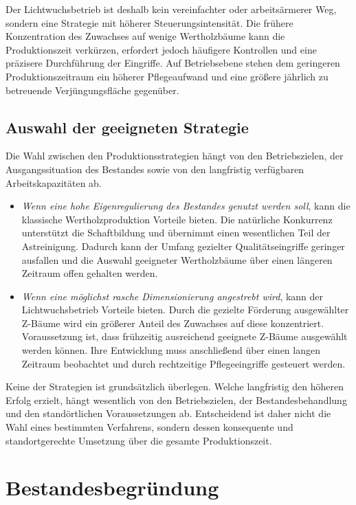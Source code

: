 \documentclass[twocolumn, bibliography=totoc, abstract=true]{scrartcl}
\begin{document}
Der Lichtwuchsbetrieb ist deshalb kein vereinfachter oder arbeitsärmerer Weg, sondern eine Strategie mit höherer Steuerungsintensität. Die frühere Konzentration des Zuwachses auf wenige Wertholzbäume kann die Produktionszeit verkürzen, erfordert jedoch häufigere Kontrollen und eine präzisere Durchführung der Eingriffe. Auf Betriebsebene stehen dem geringeren Produktionszeitraum ein höherer Pflegeaufwand und eine größere jährlich zu betreuende Verjüngungsfläche gegenüber.

\subsection{Auswahl der geeigneten Strategie}

Die Wahl zwischen den Produktionsstrategien hängt von den Betriebszielen, der Ausgangssituation des Bestandes sowie von den langfristig verfügbaren Arbeitskapazitäten ab.

\begin{itemize}
\item \emph{Wenn eine hohe Eigenregulierung des Bestandes genutzt werden soll}, kann die klassische Wertholzproduktion Vorteile bieten. Die natürliche Konkurrenz unterstützt die Schaftbildung und übernimmt einen wesentlichen Teil der Astreinigung. Dadurch kann der Umfang gezielter Qualitätseingriffe geringer ausfallen und die Auswahl geeigneter Wertholzbäume über einen längeren Zeitraum offen gehalten werden.
\item \emph{Wenn eine möglichst rasche Dimensionierung angestrebt wird}, kann der Lichtwuchsbetrieb Vorteile bieten. Durch die gezielte Förderung ausgewählter Z-Bäume wird ein größerer Anteil des Zuwachses auf diese konzentriert. Voraussetzung ist, dass frühzeitig ausreichend geeignete Z-Bäume ausgewählt werden können. Ihre Entwicklung muss anschließend über einen langen Zeitraum beobachtet und durch rechtzeitige Pflegeeingriffe gesteuert werden.
\end{itemize}

Keine der Strategien ist grundsätzlich überlegen. Welche langfristig den höheren Erfolg erzielt, hängt wesentlich von den Betriebszielen, der Bestandesbehandlung und den standörtlichen Voraussetzungen ab. Entscheidend ist daher nicht die Wahl eines bestimmten Verfahrens, sondern dessen konsequente und standortgerechte Umsetzung über die gesamte Produktionszeit.


\section{Bestandesbegründung}
\end{document}
